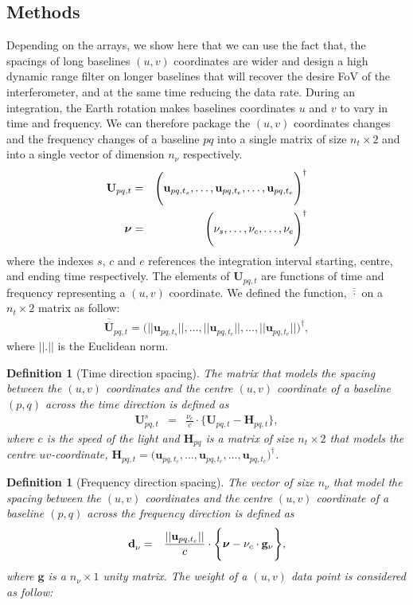 \documentclass[useAMS,usenatbib]{mn2e}
\newtheorem{definition}[theorem]{Definition}
\begin{document}
\subsection{Methods}
\label{sec:baseline1}
Depending on the arrays, we show
here that we can use the fact that, the spacings of long baselines $(u,v)$ coordinates are wider and  
design a high dynamic range filter on longer baselines that will recover the desire FoV of the interferometer, and at the same time 
reducing the data rate. During an integration, the Earth rotation makes baselines coordinates $u$ and $v$  to vary in time and 
frequency. We can therefore package the $(u,v)$ coordinates changes and the frequency changes of a baseline $pq$ into a single matrix of 
size $n_t \times 2$ and  into a single vector of dimension $n_{\nu}$ respectively. 
\begin{eqnarray*}
\mathbf{U}_{pq,t}&=& \Bigg(\mathbf{u}_{pq,t_s}, \dots , \mathbf{u}_{pq,t_c}, \dots, \mathbf{u}_{pq,t_e}\Bigg)^{\dagger}\\
 \mbox{\boldmath $\nu$}&=&\Bigg(\nu_s,\dots,\nu_c,\dots,\nu_e\Bigg)^{\dagger}
\end{eqnarray*}
where the indexes $s$, $c$ and $e$ references the integration interval starting, centre, and ending time respectively. 
The 
elements of $\mathbf{U}_{pq,t}$ are functions of time and frequency representing a $(u,v)$ coordinate.
We defined the function, $\overline{\overline{\cdot}}$ on a $n_t \times 2$ matrix as follow:
\begin{eqnarray}
\overline{\overline{\mathbf{U}}}_{pq,t}=\Bigg(||\mathbf{u}_{pq,t_s}||, \dots , ||\mathbf{u}_{pq,t_c}||, \dots, 
||\mathbf{u}_{pq,t_e}||\Bigg)^{\dagger},
\end{eqnarray}
where $||.||$ is the Euclidean norm.
\begin{definition}[Time direction spacing]
\label{def:1}
The matrix that models the spacing between the $(u,v)$ coordinates and the centre $(u,v)$ coordinate of a baseline $(p,q)$ across the time 
direction is defined as
\begin{eqnarray*}
 \mathbf{U}_{pq,t}^{s} &=&\frac{\nu_c}{c}\cdot\Bigg\{\mathbf{U}_{pq,t}-\mathbf{H}_{pq,t} \Bigg \},
\end{eqnarray*}
where $c$ is the speed of the light and $\mathbf{H}_{pq}$ is a matrix of size $n_t \times 2$ that models the centre $uv$-coordinate,
$\mathbf{H}_{pq,t}= \big(\mathbf{u}_{pq,t_c}, \dots , \mathbf{u}_{pq,t_c}, \dots, \mathbf{u}_{pq,t_c}\big)^{\dagger}$.
\end{definition}
\begin{definition}[Frequency direction spacing]
\label{def:2}
The vector of size $n_{\nu}$ that model the spacing between the $(u,v)$ coordinates and the centre $(u,v)$ coordinate of a baseline $(p,q)$ 
across the frequency direction is defined as
\begin{eqnarray*}
\mathbf{d}^{}_{\nu} &=&\frac{||\textbf{u}_{pq,t_c}||}{c}\cdot\Bigg\{\mbox{\boldmath 
$\nu$}-\nu_c\cdot\mathbf{g}_{\nu} \Bigg \},
\end{eqnarray*}
where  $\textbf{g}$ is a $n_{\nu}\times1$ unity matrix. The weight of a $(u,v)$ data point is considered as follow:
\end{definition}
\end{document}
